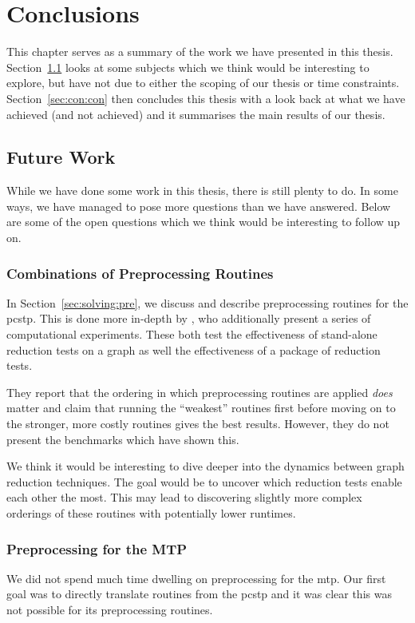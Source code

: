 \chapter{Conclusions}
This chapter serves as a summary of the work we have presented in this thesis.
Section~\ref{sec:con:fut} looks at some subjects which we think would be
interesting to explore, but have not
due to either the scoping of our thesis or
time constraints.
Section~\ref{sec:con:con} then concludes this thesis with a look back at what we
have achieved (and not achieved) and it summarises the main results of our thesis.
\section{Future Work}\label{sec:con:fut}
While we have done some work in this thesis, there is still plenty to do. In some ways,
we have managed to pose more questions than we have answered. Below are some of the open
questions which we think would be interesting to follow up on.

\subsection{Combinations of Preprocessing Routines}
In Section~\ref{sec:solving:pre}, we discuss and describe preprocessing routines for
the \gls{pcstp}. This is done more in-depth by \citet{rehfeldt2016reduction}, who
additionally present a series of computational experiments. These both test
the effectiveness of stand-alone reduction tests on a graph
as well the effectiveness of a package of reduction tests.

They report that the ordering
in which preprocessing routines are applied \textit{does} matter and claim that running
the ``weakest'' routines first before moving on to the stronger, more costly routines
gives the best results.
However, they do not present the benchmarks which have shown this.

We think it would be interesting to dive deeper into the dynamics between graph reduction
techniques. The goal would be to uncover which reduction tests
enable each other the most. This may lead to discovering slightly more
complex orderings of these routines with potentially lower runtimes.

\subsection{Preprocessing for the MTP}
We did not spend much time dwelling on preprocessing for the \gls{mtp}. Our first goal was
to directly translate routines from the \gls{pcstp} and it was clear this was not possible
for its preprocessing routines.

